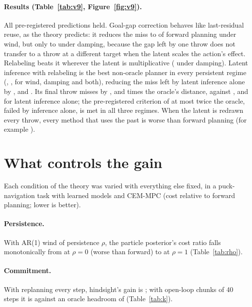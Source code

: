 \documentclass[11pt]{article}
\begin{document}
\paragraph{Results (Table~\ref{tab:v9}, Figure~\ref{fig:v9}).} All pre-registered predictions held. Goal-gap correction
behaves like last-residual reuse, as the theory predicts: it reduces the miss to \vnGapWind{} of forward planning under
wind, but only to \vnGapDamp{} under damping, because the gap left by one throw does not transfer to a throw at a
different target when the latent scales the action's effect. Relabeling beats it wherever the latent is multiplicative
(\vnAnchorDamp{} under damping). Latent inference with relabeling is the best non-oracle planner in every persistent
regime (\vnHAWind, \vnHADamp, \vnHABoth{} for wind, damping and both), reducing the miss left by latent inference alone
by \vnHAvsHWind, \vnHAvsHDamp{} and \vnHAvsHBoth. Its final throw misses by \vnHAOracleWind, \vnHAOracleDamp{} and
\vnHAOracleBoth{} times the oracle's distance, against \twOracleGapWind, \twOracleGapDamp{} and \twOracleGapBoth{} for latent
inference alone; the pre-registered criterion of at most twice the oracle, failed by inference alone, is met in all
three regimes. When the latent is redrawn every throw, every method that uses the past is worse than forward planning
(for example \vnHAFresh).

\section{What controls the gain}
\label{sec:mech}
Each condition of the theory was varied with everything else fixed, in a puck-navigation task with learned models and
CEM-MPC (cost relative to forward planning; lower is better).

\paragraph{Persistence.} With AR(1) wind of persistence $\rho$, the particle posterior's cost ratio falls monotonically
from \rhoZero{} at $\rho=0$ (worse than forward) to \rhoOne{} at $\rho=1$ (Table~\ref{tab:rho}).

\paragraph{Commitment.} With replanning every step, hindsight's gain is \ksGainOne; with open-loop chunks of 40 steps it
is \ksGainForty{} against an oracle headroom of \ksHeadForty{} (Table~\ref{tab:k}).
\end{document}
